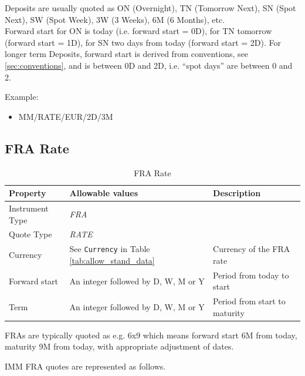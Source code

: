 Deposits are usually quoted as ON (Overnight), TN (Tomorrow Next), SN
(Spot Next), SW (Spot Week), 3W (3 Weeks), 6M (6 Months), etc. \\

Forward start for ON is today (i.e. forward start = 0D), for TN tomorrow (forward start = 1D), for SN two days from
today (forward start = 2D). For longer term Deposits, forward start is derived from conventions, see
\ref{sec:conventions}, and is between 0D and 2D, i.e. ``spot days'' are between 0 and 2.

\medskip
Example:
\begin{itemize}
\item {MM/RATE/EUR/2D/3M}
\end{itemize}

\subsection{FRA Rate}

\begin{table}[H]
\centering
  \begin{tabular}{|p{3.5cm}|p{3.5cm}|p{6.5cm}|}
  \hline
    {\bf Property} & {\bf Allowable values} & {\bf Description} \\ \hline
    Instrument Type & \emph{FRA} & \\ \hline
    Quote Type & \emph{RATE} & \\ \hline
    Currency & See \lstinline!Currency! in Table \ref{tab:allow_stand_data} & Currency of the FRA rate\\ \hline
    Forward start & An integer followed by D, W, M or Y  & Period from today to start  \\ \hline
    Term & An integer followed by D, W, M or Y & Period from start to maturity\\ \hline
  \end{tabular}
  \caption{FRA Rate}
  \label{tab:fra_quote}
\end{table}
FRAs are typically quoted as e.g. 6x9 which means forward start 6M from today, maturity 9M from today, with appropriate
adjustment of dates.

\medskip
IMM FRA quotes are represented as follows.

